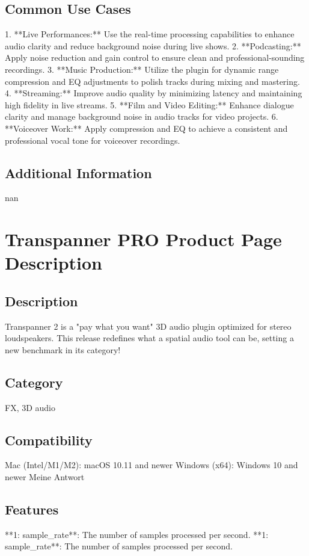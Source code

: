 \documentclass[8pt]{article}
\begin{document}
{{{{    \subsection*{Common Use Cases}
    1. **Live Performances:** Use the real-time processing capabilities to enhance audio clarity and reduce background noise during live shows.
2. **Podcasting:** Apply noise reduction and gain control to ensure clean and professional-sounding recordings.
3. **Music Production:** Utilize the plugin for dynamic range compression and EQ adjustments to polish tracks during mixing and mastering.
4. **Streaming:** Improve audio quality by minimizing latency and maintaining high fidelity in live streams.
5. **Film and Video Editing:** Enhance dialogue clarity and manage background noise in audio tracks for video projects.
6. **Voiceover Work:** Apply compression and EQ to achieve a consistent and professional vocal tone for voiceover recordings.

    \subsection*{Additional Information}
    nan
    

    \section*{Transpanner PRO  Product Page Description}

    \subsection*{Description}
    Transpanner 2 is a "pay what you want" 3D audio plugin optimized for stereo loudspeakers. This release redefines what a spatial audio tool can be, setting a new benchmark in its category!

    \subsection*{Category}
    FX, 3D audio

    \subsection*{Compatibility}
    Mac (Intel/M1/M2): macOS 10.11 and newer
Windows (x64): Windows 10 and newer
Meine Antwort


    \subsection*{Features}
    **1: sample_rate**: The number of samples processed per second.
**1: sample_rate**: The number of samples processed per second.

}}}}
\end{document}
